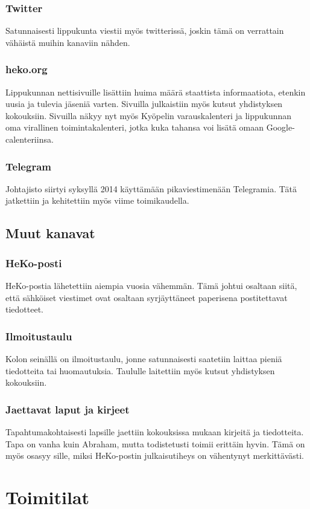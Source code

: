 \documentclass[a4paper, 12pt, finnish]{report} %
\begin{document}
\subsubsection{Twitter}
Satunnaisesti lippukunta viestii myös twitterissä, joskin tämä on verrattain vähäistä muihin kanaviin nähden.
\subsubsection{heko.org}
Lippukunnan nettisivuille lisättiin huima määrä staattista informaatiota, etenkin uusia ja tulevia jäseniä varten. Sivuilla julkaistiin myös kutsut yhdistyksen kokouksiin. Sivuilla näkyy nyt myös Kyöpelin varauskalenteri ja lippukunnan oma virallinen toimintakalenteri, jotka kuka tahansa voi lisätä omaan Google-calenteriinsa.
\subsubsection{Telegram}
Johtajisto siirtyi syksyllä 2014 käyttämään pikaviestimenään Telegramia. Tätä jatkettiin ja kehitettiin myös viime toimikaudella.
\subsection{Muut kanavat}
\subsubsection{HeKo-posti}
HeKo-postia lähetettiin aiempia vuosia vähemmän. Tämä johtui osaltaan siitä, että sähköiset viestimet ovat osaltaan syrjäyttäneet paperisena postitettavat tiedotteet.
\subsubsection{Ilmoitustaulu}
Kolon seinällä on ilmoitustaulu, jonne satunnaisesti saatetiin laittaa pieniä tiedotteita tai huomautuksia. Taululle laitettiin myös kutsut yhdistyksen kokouksiin.
\subsubsection{Jaettavat laput ja kirjeet}
Tapahtumakohtaisesti lapsille jaettiin kokouksissa mukaan kirjeitä ja tiedotteita. Tapa on vanha kuin Abraham, mutta todistetusti toimii erittäin hyvin. Tämä on myös osasyy sille, miksi HeKo-postin julkaisutiheys on vähentynyt merkittävästi.
\newpage
\section{Toimitilat}
\end{document}
